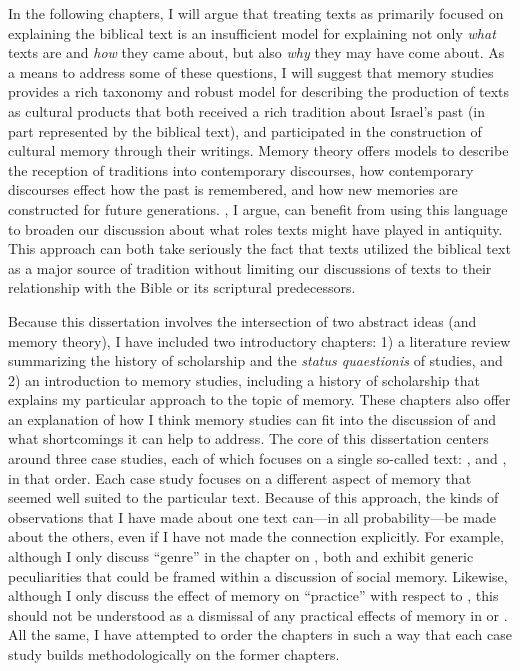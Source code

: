 In the following chapters, I will argue that treating \rwb texts as primarily focused on explaining the biblical text is an insufficient model for explaining not only \emph{what} \rwb texts are and \emph{how} they came about, but also \emph{why} they may have come about. As a means to address some of these questions, I will suggest that memory studies provides a rich taxonomy and robust model for describing the production of \rwb texts as cultural products that both received a rich tradition about Israel's past (in part represented by the biblical text), and participated in the construction of cultural memory through their writings. Memory theory offers models to describe the reception of traditions into contemporary discourses, how contemporary discourses effect how the past is remembered, and how new memories are constructed for future generations. \rwb, I argue, can benefit from using this language to broaden our discussion about what roles \rwb texts might have played in antiquity. This approach can both take seriously the fact that \rwb texts utilized the biblical text as a major source of tradition without limiting our discussions of \rwb texts to their relationship with the Bible or its scriptural predecessors.



Because this dissertation involves the intersection of two abstract ideas (\rwb and memory theory), I have included two introductory chapters: 1) a literature review summarizing the history of scholarship and the \emph{status quaestionis} of \rwb studies, and 2) an introduction to memory studies, including a history of scholarship that explains my particular approach to the topic of memory. These chapters also offer an explanation of how I think memory studies can fit into the discussion of \rwb and what shortcomings it can help to address. The core of this dissertation centers around three case studies, each of which focuses on a single so-called \rwb text: \chronicles, \ga and \jub, in that order. Each case study focuses on a different aspect of memory that seemed well suited to the particular text. Because of this approach, the kinds of observations that I have made about one text can---in all probability---be made about the others, even if I have not made the connection explicitly. For example, although I only discuss ``genre'' in the chapter on \ga, both \chronicles and \jub exhibit generic peculiarities that could be framed within a discussion of social memory. Likewise, although I only discuss the effect of memory on ``practice'' with respect to \jub, this should not be understood as a dismissal of any practical effects of memory in \chronicles or \ga. All the same, I have attempted to order the chapters in such a way that each case study builds methodologically on the former chapters.

